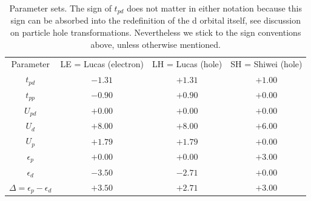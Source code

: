 \documentclass[prl,12pt,onecolumn,nofootinbib,notitlepage,english,superscriptaddress]{revtex4-1}
\begin{document}
\begin{table}
\setlength\extrarowheight{8pt}
\begin{ruledtabular}
 \begin{tabular}{cccc}
  Parameter				&  LE = Lucas (electron)    & LH = Lucas (hole) & SH = Shiwei (hole) \\ 
	$t_{pd}$			&  $-1.31$		    & $+1.31$        &     $+1.00$ 	       \\
	$t_{pp}$			&  $-0.90$		    & $+0.90$        &     $+0.00$	       \\
	$U_{pd}$			&  $+0.00$		    & $+0.00$        &     $+0.00$ 	       \\
	$U_{d}$				&  $+8.00$		    & $+8.00$        &     $+6.00$ 	       \\
	$U_{p}$				&  $+1.79$		    & $+1.79$        &     $+0.00$ 	       \\
        $\epsilon_{p}$			&  $+0.00$		    & $+0.00$        &     $+3.00$          \\
        $\epsilon_{d}$			&  $-3.50$		    & $-2.71$        &     $+0.00$          \\
$\Delta=\epsilon_{p}-\epsilon_{d}$      &  $+3.50$		    & $+2.71$        &     $+3.00$          \\
  \end{tabular}
 \end{ruledtabular}
 \caption{Parameter sets. The sign of $t_{pd}$ does not matter in either notation because this sign can be absorbed 
into the redefinition of the d orbital itself, see discussion on particle hole transformations. 
Nevertheless we stick to the sign conventions above, unless otherwise mentioned.}
 \label{table:params}
\end{table}
\end{document}
